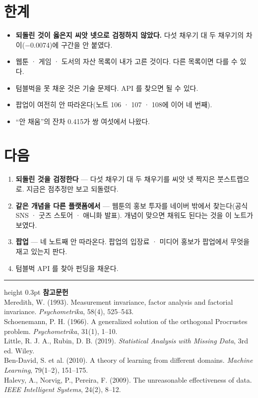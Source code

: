 \documentclass[10pt]{article}
\begin{document}
\section{한계}

\begin{itemize}[leftmargin=1.1em,itemsep=0.15em]
\item \textbf{되돌린 것이 옳은지 씨앗 넷으로 검정하지 않았다.} 다섯 채우기
      대 두 채우기의 차이($-$0.0074)에 구간을 안 붙였다.
\item 웹툰 · 게임 · 도서의 자산 목록이 내가 고른 것이다. 다른 목록이면
      다를 수 있다.
\item 텀블벅을 못 채운 것은 기술 문제다. API 를 찾으면 될 수 있다.
\item 팝업이 여전히 안 따라온다(노트 106 · 107 · 108에 이어 네 번째).
\item ``안 채움''의 잔차 0.415가 쌍 여섯에서 나왔다.
\end{itemize}

\section{다음}

\begin{enumerate}[leftmargin=1.3em,itemsep=0.15em]
\item \textbf{되돌린 것을 검정한다} --- 다섯 채우기 대 두 채우기를 씨앗 넷
      짝지은 붓스트랩으로. 지금은 점추정만 보고 되돌렸다.
\item \textbf{같은 개념을 다른 플랫폼에서} --- 웹툰의 홍보 투자를 네이버 밖에서
      찾는다(공식 SNS · 굿즈 스토어 · 애니화 발표). 개념이 맞으면 채워도 된다는
      것을 이 노트가 보였다.
\item \textbf{팝업} --- 네 노트째 안 따라온다. 팝업의 입장료 · 미디어 홍보가
      팝업에서 무엇을 재고 있는지 판다.
\item 텀블벅 API 를 찾아 펀딩을 채운다.
\end{enumerate}

\vspace{0.6em}
\hrule height 0.3pt
\vspace{0.5em}
{\footnotesize
\textbf{참고문헌}\\[0.3em]
Meredith, W. (1993). Measurement invariance, factor analysis and factorial
invariance. \emph{Psychometrika}, 58(4), 525--543.\\[0.15em]
Schoenemann, P. H. (1966). A generalized solution of the orthogonal Procrustes
problem. \emph{Psychometrika}, 31(1), 1--10.\\[0.15em]
Little, R. J. A., Rubin, D. B. (2019). \emph{Statistical Analysis with Missing
Data}, 3rd ed. Wiley.\\[0.15em]
Ben-David, S. et al. (2010). A theory of learning from different domains.
\emph{Machine Learning}, 79(1--2), 151--175.\\[0.15em]
Halevy, A., Norvig, P., Pereira, F. (2009). The unreasonable effectiveness of
data. \emph{IEEE Intelligent Systems}, 24(2), 8--12.
}
\end{document}
